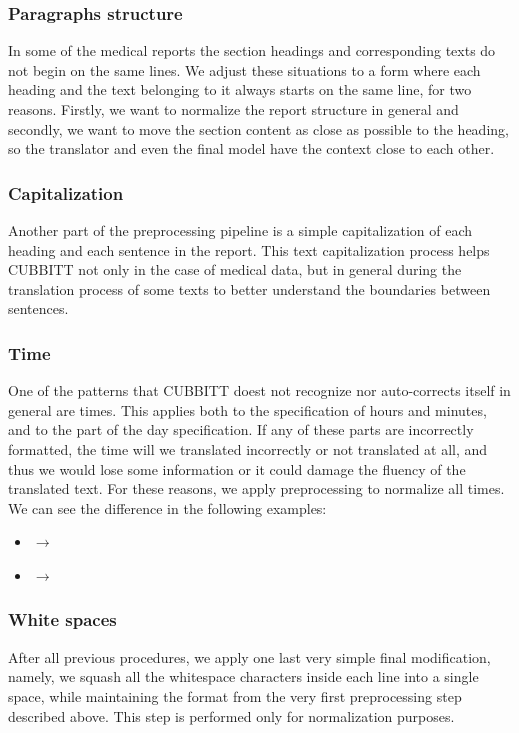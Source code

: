 \subsubsection*{Paragraphs structure}
In some of the medical reports the section headings and corresponding texts do not begin on the same lines. We adjust these situations to a form where each heading and the text belonging to it always starts on the same line, for two reasons. Firstly, we want to normalize the report structure in general and secondly, we want to move the section content as close as possible to the heading, so the translator and even the final model have the context close to each other.

\subsubsection*{Capitalization}
Another part of the preprocessing pipeline is a simple capitalization of each heading and each sentence in the report. This text capitalization process helps CUBBITT not only in the case of medical data, but in general during the translation process of some texts to better understand the boundaries between sentences.

\subsubsection*{Time}
One of the patterns that CUBBITT doest not recognize nor auto-corrects itself in general are times. This applies both to the specification of hours and minutes, and to the  part of the day specification. If any of these parts are incorrectly formatted, the time will we translated incorrectly or not translated at all, and thus we would lose some information or it could damage the fluency of the translated text. For these reasons, we apply preprocessing to normalize all times. We can see the difference in the following examples:
\begin{itemize}
	\item {} $\rightarrow$ 
	\item {} $\rightarrow$ 
\end{itemize}

\subsubsection*{White spaces}
After all previous procedures, we apply one last very simple final modification, namely, we squash all the whitespace characters inside each line into a single space, while maintaining the format from the very first preprocessing step described above. This step is performed only for normalization purposes.

